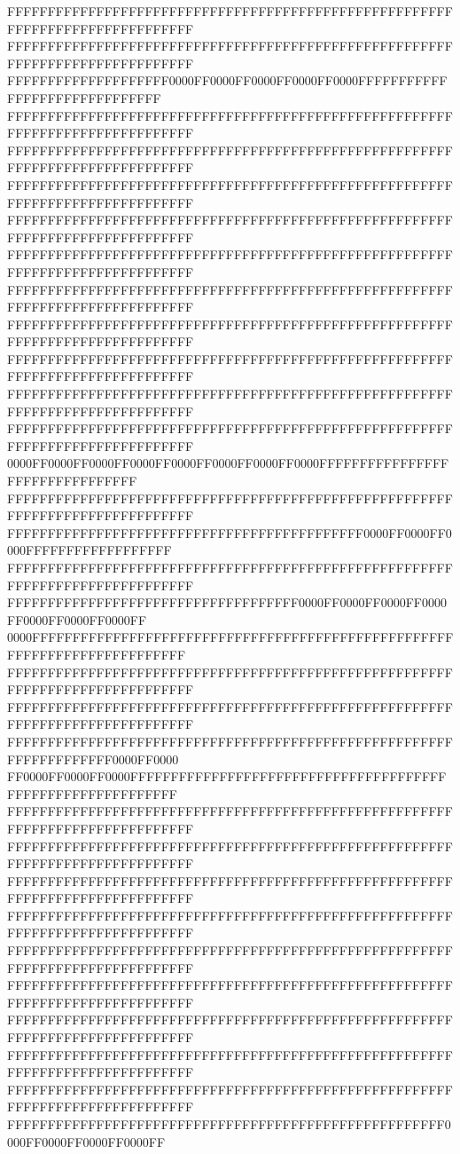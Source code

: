 FFFFFFFFFFFFFFFFFFFFFFFFFFFFFFFFFFFFFFFFFFFFFFFFFFFFFFFFFFFFFFFFFFFFFFFFFFFFFF
FFFFFFFFFFFFFFFFFFFFFFFFFFFFFFFFFFFFFFFFFFFFFFFFFFFFFFFFFFFFFFFFFFFFFFFFFFFFFF
FFFFFFFFFFFFFFFFFFFF0000FF0000FF0000FF0000FF0000FFFFFFFFFFFFFFFFFFFFFFFFFFFFFF
FFFFFFFFFFFFFFFFFFFFFFFFFFFFFFFFFFFFFFFFFFFFFFFFFFFFFFFFFFFFFFFFFFFFFFFFFFFFFF
FFFFFFFFFFFFFFFFFFFFFFFFFFFFFFFFFFFFFFFFFFFFFFFFFFFFFFFFFFFFFFFFFFFFFFFFFFFFFF
FFFFFFFFFFFFFFFFFFFFFFFFFFFFFFFFFFFFFFFFFFFFFFFFFFFFFFFFFFFFFFFFFFFFFFFFFFFFFF
FFFFFFFFFFFFFFFFFFFFFFFFFFFFFFFFFFFFFFFFFFFFFFFFFFFFFFFFFFFFFFFFFFFFFFFFFFFFFF
FFFFFFFFFFFFFFFFFFFFFFFFFFFFFFFFFFFFFFFFFFFFFFFFFFFFFFFFFFFFFFFFFFFFFFFFFFFFFF
FFFFFFFFFFFFFFFFFFFFFFFFFFFFFFFFFFFFFFFFFFFFFFFFFFFFFFFFFFFFFFFFFFFFFFFFFFFFFF
FFFFFFFFFFFFFFFFFFFFFFFFFFFFFFFFFFFFFFFFFFFFFFFFFFFFFFFFFFFFFFFFFFFFFFFFFFFFFF
FFFFFFFFFFFFFFFFFFFFFFFFFFFFFFFFFFFFFFFFFFFFFFFFFFFFFFFFFFFFFFFFFFFFFFFFFFFFFF
FFFFFFFFFFFFFFFFFFFFFFFFFFFFFFFFFFFFFFFFFFFFFFFFFFFFFFFFFFFFFFFFFFFFFFFFFFFFFF
FFFFFFFFFFFFFFFFFFFFFFFFFFFFFFFFFFFFFFFFFFFFFFFFFFFFFFFFFFFFFFFFFFFFFFFFFFFFFF
0000FF0000FF0000FF0000FF0000FF0000FF0000FF0000FFFFFFFFFFFFFFFFFFFFFFFFFFFFFFFF
FFFFFFFFFFFFFFFFFFFFFFFFFFFFFFFFFFFFFFFFFFFFFFFFFFFFFFFFFFFFFFFFFFFFFFFFFFFFFF
FFFFFFFFFFFFFFFFFFFFFFFFFFFFFFFFFFFFFFFFFFFF0000FF0000FF0000FFFFFFFFFFFFFFFFFF
FFFFFFFFFFFFFFFFFFFFFFFFFFFFFFFFFFFFFFFFFFFFFFFFFFFFFFFFFFFFFFFFFFFFFFFFFFFFFF
FFFFFFFFFFFFFFFFFFFFFFFFFFFFFFFFFFFF0000FF0000FF0000FF0000FF0000FF0000FF0000FF
0000FFFFFFFFFFFFFFFFFFFFFFFFFFFFFFFFFFFFFFFFFFFFFFFFFFFFFFFFFFFFFFFFFFFFFFFFFF
FFFFFFFFFFFFFFFFFFFFFFFFFFFFFFFFFFFFFFFFFFFFFFFFFFFFFFFFFFFFFFFFFFFFFFFFFFFFFF
FFFFFFFFFFFFFFFFFFFFFFFFFFFFFFFFFFFFFFFFFFFFFFFFFFFFFFFFFFFFFFFFFFFFFFFFFFFFFF
FFFFFFFFFFFFFFFFFFFFFFFFFFFFFFFFFFFFFFFFFFFFFFFFFFFFFFFFFFFFFFFFFFFF0000FF0000
FF0000FF0000FF0000FFFFFFFFFFFFFFFFFFFFFFFFFFFFFFFFFFFFFFFFFFFFFFFFFFFFFFFFFFFF
FFFFFFFFFFFFFFFFFFFFFFFFFFFFFFFFFFFFFFFFFFFFFFFFFFFFFFFFFFFFFFFFFFFFFFFFFFFFFF
FFFFFFFFFFFFFFFFFFFFFFFFFFFFFFFFFFFFFFFFFFFFFFFFFFFFFFFFFFFFFFFFFFFFFFFFFFFFFF
FFFFFFFFFFFFFFFFFFFFFFFFFFFFFFFFFFFFFFFFFFFFFFFFFFFFFFFFFFFFFFFFFFFFFFFFFFFFFF
FFFFFFFFFFFFFFFFFFFFFFFFFFFFFFFFFFFFFFFFFFFFFFFFFFFFFFFFFFFFFFFFFFFFFFFFFFFFFF
FFFFFFFFFFFFFFFFFFFFFFFFFFFFFFFFFFFFFFFFFFFFFFFFFFFFFFFFFFFFFFFFFFFFFFFFFFFFFF
FFFFFFFFFFFFFFFFFFFFFFFFFFFFFFFFFFFFFFFFFFFFFFFFFFFFFFFFFFFFFFFFFFFFFFFFFFFFFF
FFFFFFFFFFFFFFFFFFFFFFFFFFFFFFFFFFFFFFFFFFFFFFFFFFFFFFFFFFFFFFFFFFFFFFFFFFFFFF
FFFFFFFFFFFFFFFFFFFFFFFFFFFFFFFFFFFFFFFFFFFFFFFFFFFFFFFFFFFFFFFFFFFFFFFFFFFFFF
FFFFFFFFFFFFFFFFFFFFFFFFFFFFFFFFFFFFFFFFFFFFFFFFFFFFFFFFFFFFFFFFFFFFFFFFFFFFFF
FFFFFFFFFFFFFFFFFFFFFFFFFFFFFFFFFFFFFFFFFFFFFFFFFFFFFF0000FF0000FF0000FF0000FF
